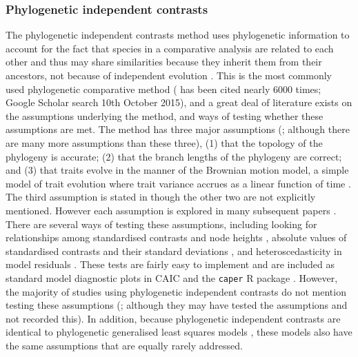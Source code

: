 \documentclass[a4paper,12pt]{article}
\begin{document}
\subsubsection{Phylogenetic independent contrasts}
The phylogenetic independent contrasts method uses phylogenetic information to account for the fact that species in a comparative analysis are related to each other and thus may share similarities because they inherit them from their ancestors, not because of independent evolution \citep{felsenstein1985phylogenies,harvey1991comparative}. 
This is the most commonly used phylogenetic comparative method (\citet{felsenstein1985phylogenies} has been cited nearly 6000 times; Google Scholar search 10th October 2015), and a great deal of literature exists on the assumptions underlying the method, and ways of testing whether these assumptions are met. 
The method has three major assumptions (\citealp{diaz1996testing}; although there are many more assumptions than these three), (1) that the topology of the phylogeny is accurate; (2) that the branch lengths of the phylogeny are correct; and (3) that traits evolve in the manner of the Brownian motion model, a simple model of trait evolution where trait variance accrues as a linear function of time \citep{cavalli1967,felsenstein1973maximum}.
The third assumption is stated in \citet{felsenstein1985phylogenies} though the other two are not explicitly mentioned. 
However each assumption is explored in many subsequent papers \citep[e.g.][]{felsenstein1988phylogenies,grafen1989phylogenetic,harvey1991comparative,garland1992procedures,purvis1995comparative,diaz1996testing,hansen1996translating,martins1997phylogenies,freckleton2000phylogenetic,garland2000using,hansen2005assessing,freckleton2006detecting,rohle2006comment}.
There are several ways of testing these assumptions, including looking for relationships among standardised contrasts and node heights \citep{grafen1989phylogenetic,freckleton2006detecting}, absolute values of standardised contrasts and their standard deviations \citep{garland1992procedures,diaz1996testing}, and heteroscedasticity in model residuals \citep{purvis1995mammal}.
These tests are fairly easy to implement and are included as standard model diagnostic plots in CAIC and the \texttt{caper} R package \citep{purvis1995comparative,Orme:2013aa,R-Core-Team:2014aa}.
However, the majority of studies using phylogenetic independent contrasts do not mention testing these assumptions (\citealp{freckleton2006detecting}; although they may have tested the assumptions and not recorded this).
In addition, because phylogenetic independent contrasts are identical to phylogenetic generalised least squares models \citep{garland2000using,rohle2006comment,blomberg2012independent}, these models also have the same assumptions that are equally rarely addressed. 
\end{document}
